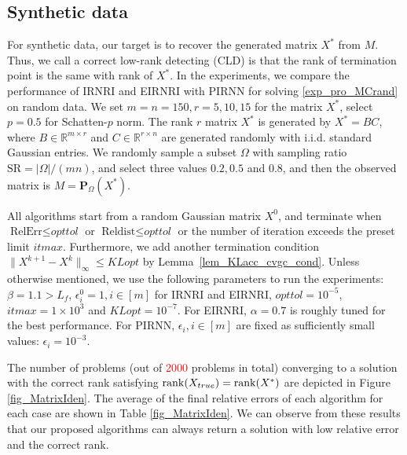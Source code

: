 \documentclass[twoside,11pt]{article}
\newcommand\red[1]{\textcolor{red}{#1}}
\numberwithin{equation}{section}
\begin{document}
\subsection{Synthetic data}

For synthetic data, our target is to recover the generated matrix $X^{*}$ from $M$. Thus, we call a correct low-rank detecting (CLD) is that the rank of termination point is the same with rank of $X^{*}$. 
In the experiments, we compare  the performance of IRNRI and EIRNRI with PIRNN \cite{opt_simu_svd_2017}  for solving \eqref{exp_pro_MCrand} on random data.
We set $m = n = 150,r=5,10,15$ for the matrix $X^{*}$, select $p=0.5$ for Schatten-$p$ norm.  
The rank $r$ matrix $X^{*}$ is generated by $X^{*} = BC$, where $B\in\mathbb{R}^{m\times r}$ and $C\in\mathbb{R}^{r\times n}$ are generated randomly with {i.i.d.} standard Gaussian entries. 
We randomly sample a subset $\Omega$ with sampling ratio $\text{SR}=|\Omega| / {(mn)}$, and select three values $0.2, 0.5$ and $0.8$, and then the observed matrix is $M = \mathbf{P}_{\Omega} (X^{*})$.






All algorithms start from a random Gaussian matrix $X^{0}$, and terminate when $\text{RelErr}\le\textit{opttol}$ or $\text{Reldist}\le\textit{opttol}$ or the number of iteration exceeds the preset limit $\textit{itmax}$. Furthermore, we add another termination condition $\|X^{k+1}-X^{k}\|_{\infty} \le \textit{KLopt}$ by Lemma~\ref{lem_KLacc_cvgc_cond}.
Unless otherwise mentioned, we use the following parameters to run the experiments: $\beta=1.1 > L_f$,  $\epsilon_{i}^{0}=1,i\in[m]$ for IRNRI and EIRNRI, $\textit{opttol}=10^{-5} $, $\textit{itmax}=1\times 10^{3}$ and $\textit{KLopt} = 10^{-7}$.  For EIRNRI,  $\alpha = 0.7$ is roughly tuned for the best performance. 
For PIRNN,  $\epsilon_i, i\in[m]$ are fixed as sufficiently small values: $\epsilon_i =  10^{-3}$.  


The number of problems (out of \red{2000} problems in total) converging to a solution with the correct rank satisfying ${\rm rank}(X_{true}) = {\rm rank}(X^{*})$ are depicted 
 in Figure \ref{fig_MatrixIden}.  The average of the final  relative errors of each algorithm for each case 
 are shown in Table \ref{fig_MatrixIden}. 
We can observe from these results that our proposed algorithms can always return 
a solution with low relative error and the correct rank.  
\end{document}
